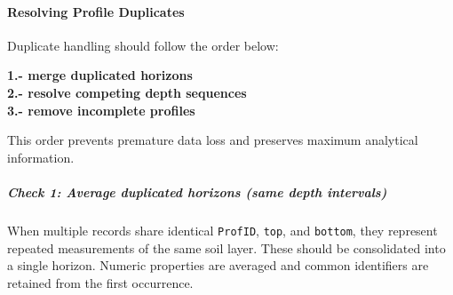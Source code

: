 \documentclass[
  10pt,
  b5paper,
  oneside]{book}
\begin{document}
\paragraph*{Resolving Profile Duplicates}\label{resolving-profile-duplicates}

Duplicate handling should follow the order below:

\textbf{1.- merge duplicated horizons}\\
\textbf{2.- resolve competing depth sequences}\\
\textbf{3.- remove incomplete profiles}

This order prevents premature data loss and preserves maximum analytical information.

\subparagraph*{Check 1: Average duplicated horizons (same depth intervals)}\label{check-1-average-duplicated-horizons-same-depth-intervals}

When multiple records share identical \texttt{ProfID}, \texttt{top}, and \texttt{bottom}, they represent repeated measurements of the same soil layer. These should be consolidated into a single horizon. Numeric properties are averaged and common identifiers are retained from the first occurrence.
\end{document}
